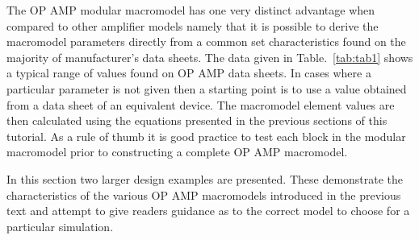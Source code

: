 The OP AMP modular macromodel has one very distinct advantage when compared to other amplifier models namely that it is possible to derive the macromodel parameters directly from a common set characteristics found on the majority of manufacturer's data sheets. The data given in Table.~\ref{tab:tab1} shows a typical range of values found on OP AMP data sheets.  In cases where a particular parameter is not given then a starting point is to use a value obtained from a data sheet of an equivalent device. The macromodel element values are then calculated using the equations presented in the previous sections of this tutorial.  As a rule of thumb it is good practice to test each block in the modular macromodel prior to constructing a complete OP AMP macromodel.



In this section two larger design examples are presented. These demonstrate the characteristics of the various OP AMP macromodels introduced in the previous text and attempt to give readers guidance as to the correct model to choose for a particular simulation.


